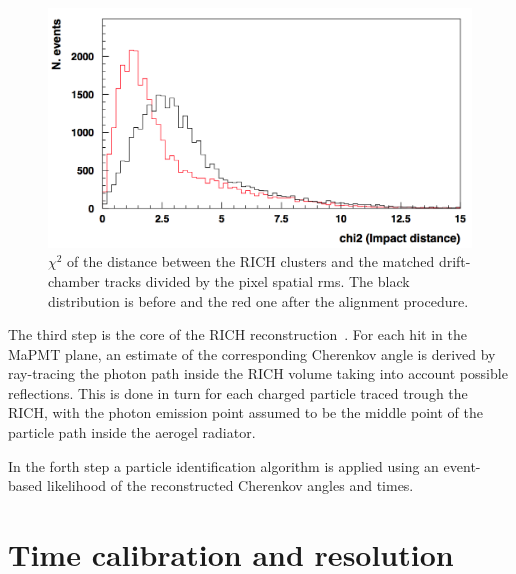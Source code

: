 \documentclass[5p,times,twocolumn]{elsarticle}
\def\MaPMT{MaPMT }
\begin{document}
\begin{figure}[t]
\begin{center}
\includegraphics[width=1.0\columnwidth]{ckmaca.png}
\end{center}
\caption{$\chi^2$ of the distance between the RICH clusters and the matched drift-chamber tracks divided by the pixel spatial rms. The black distribution is before and the red one after the alignment procedure.}
\label{Fig:DCmatch}
\end{figure}

The third step is the core of the RICH reconstruction~\cite{Ref:CLASREC}. For each hit in the MaPMT plane, an estimate of the corresponding Cherenkov angle is derived by ray-tracing the photon path inside the RICH volume taking into account possible reflections. This is done in turn for each charged particle traced trough the RICH, with the photon emission point assumed to be the middle point of the particle path inside the aerogel radiator.

In the forth step a particle identification algorithm is applied using an event-based likelihood of the reconstructed Cherenkov angles and times.


\section{Time calibration and resolution}
\label{sec:TimeCalib}
\end{document}

